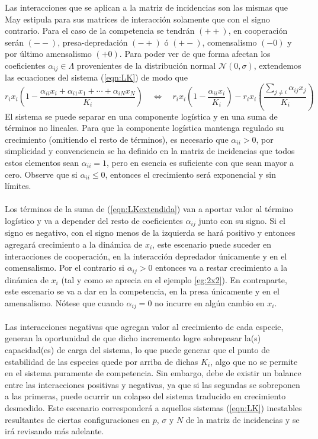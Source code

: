 Las interacciones que se aplican a la matriz de incidencias son las mismas que May estipula para sus matrices de interacción solamente que con el signo contrario. Para el caso de la competencia se tendrán $(++)$, en cooperación serán $(--)$, presa-depredación $(-+)$ ó $(+-)$, comensalismo $(-0)$ y por último amensalismo $(+0)$. Para poder ver de que forma afectan los coeficientes $\alpha_{ij}\in\Lambda$ provenientes de la distribución normal $\mathcal{N}(0,\sigma)$, extendemos las ecuaciones del sistema (\ref{eqn:LK}) de modo que
\begin{equation}\label{eqn:LKextendida}
	r_ix_i\left (1 - \frac{\alpha_{ii}x_i+\alpha_{i1}x_1+\cdots+\alpha_{iN}x_N}{K_i}\right )\quad\Longleftrightarrow\quad r_ix_i\left (1-\frac{\alpha_{ii}x_i}{K_i}\right )-r_ix_i\left (\frac{\sum_{j\neq i}\alpha_{ij}x_j}{K_i}\right )
\end{equation}
El sistema se puede separar en una componente logística y en una suma de términos no lineales. Para que la componente logística mantenga regulado su crecimiento (omitiendo el resto de términos), es necesario que $\alpha_{ii}>0$, por simplicidad y convenciencia se ha definido en la matriz de incidencias que todos estos elementos sean $\alpha_{ii}=1$, pero en esencia es suficiente con que sean mayor a cero. Observe que si $\alpha_{ii}\leq 0$, entonces el crecimiento será exponencial y sin límites.
\\
\\
Los términos de la suma de (\ref{eqn:LKextendida}) van a aportar valor al término logístico y va a depender del resto de coeficientes $\alpha_{ij}$ junto con su signo. Si el signo es negativo, con el signo menos de la izquierda se hará positivo y entonces agregará crecimiento a la dinámica de $x_i$, este escenario puede suceder en interacciones de cooperación, en la interacción depredador únicamente y en el comensalismo. Por el contrario si $\alpha_{ij}>0$ entonces va a restar crecimiento a la dinámica de $x_i$ (tal y como se aprecia en el ejemplo \ref{eg:2x2}). En contraparte, este escenario se va a dar en la competencia, en la presa únicamente y en el amensalismo. Nótese que cuando $\alpha_{ij}=0$ no incurre en algún cambio en $x_i$. \\
\\
Las interacciones negativas que agregan valor al crecimiento de cada especie, generan la oportunidad de que dicho incremento logre sobrepasar la(s) capacidad(es) de carga del sistema, lo que puede generar que el punto de estabilidad de las especies quede por arriba de dichas $K_i$, algo que no se permite en el sistema puramente de competencia. Sin embargo, debe de existir un balance entre las interacciones positivas y negativas, ya que si las segundas se sobreponen a las primeras, puede ocurrir un colapso del sistema traducido en crecimiento desmedido. Este escenario corresponderá a aquellos sistemas (\ref{eqn:LK}) inestables resultantes de ciertas configuraciones en $p$, $\sigma$ y $N$ de la matriz de incidencias y se irá revisando más adelante.\\
